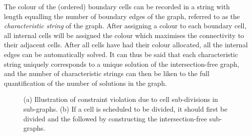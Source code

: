 \documentclass[conference]{IEEEtran}
\begin{document}
The colour of the (ordered) boundary cells can be recorded in a string with length equalling the number of boundary edges of the graph, referred to as 
the \textit{characteristic string} of the graph. After assigning a colour to each boundary cell, all internal cells will be assigned the colour which maximises 
the connectivity to their adjacent cells. 
After all cells have had their colour allocated, all the internal edges can be  automatically solved. 
It can thus be said that each characteristic string uniquely corresponds to a unique solution of the intersection-free graph, 
and the number of characteristic strings can then be liken to the full quantification of the number of solutions in the graph. 
\begin{figure}[t]
\centering
{}
\caption{(a) Illustration of constraint violation due to cell sub-divisions in sub-graphs. (b) If a cell is scheduled to be divided, it should first be divided and the followed by  constructing the intersection-free sub-graphs.}
\label{fig:constraint_violation}
\end{figure}
\end{document}
